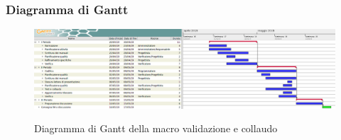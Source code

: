         \begin{landscape}
			\subsubsection{Diagramma di Gantt}
			\begin{figure}[H]
					\centering
					\includegraphics[scale=0.43]{img/Validazione_e_collaudo.png}\\
					\caption{Diagramma di Gantt della macro validazione e collaudo}
			\end{figure}
		\end{landscape}
		\newpage
